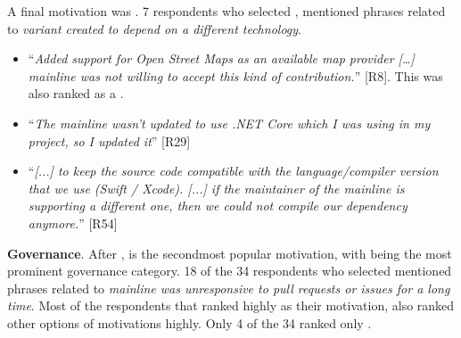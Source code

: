 \nd A final  motivation was .
7 respondents who selected , mentioned phrases related to \emph{variant created to depend on a different technology}.

\begin{itemize}[leftmargin=*]
\item ``\emph{Added support for Open Street Maps as an available map provider [\ldots] mainline was not willing to accept this kind of contribution.}'' [R8]. This was also ranked as a .
\item ``\emph{The mainline wasn't updated to use .NET Core which I was using in my project, so I updated it}'' [R29]
\item ``\emph{[...] to keep the source code compatible with the language/compiler version that we use (Swift / Xcode). [...] %
if the maintainer of the mainline is supporting a different one, then we could not compile our dependency anymore.}'' [R54]
\end{itemize}

\nd \textbf{Governance}. After ,  is the secondmost popular motivation, with  being the most prominent governance category. 18 of the 34 respondents who selected  mentioned phrases related to \emph{mainline was unresponsive to pull requests or issues for a long time}. Most of the respondents that ranked  highly as their motivation, also ranked other options of motivations highly. Only 4 of the 34 ranked only .


